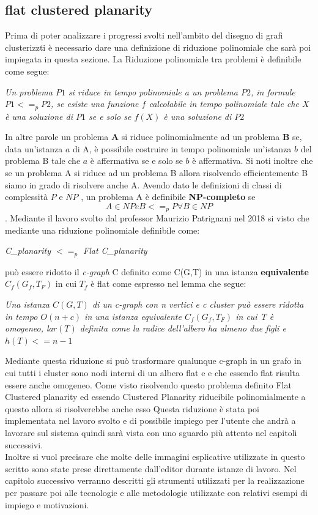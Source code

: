 {\subsection{flat clustered planarity}
Prima di poter analizzare i progressi svolti nell'ambito del disegno di grafi clusterizzti è necessario dare una definizione di riduzione polinomiale che sarà poi impiegata in questa sezione.
La Riduzione polinomiale tra problemi è definibile come segue:
\begin{center}
	\textit{Un problema $P1$ si riduce in tempo polinomiale a un problema $P2$, in formule $P1<=_pP2$, se esiste una funzione $f$ calcolabile in tempo polinomiale tale che $X$ è una soluzione di $P1$ se e solo se $f(X)$ è una soluzione di $P2$}
\end{center}
In altre parole un problema \textbf{A} si riduce polinomialmente ad un problema \textbf{B} se, data un’istanza $a$ di A, è possibile costruire in tempo polinomiale un’istanza $b$ del problema B tale che $a$ è affermativa se e solo se $b$ è affermativa.
Si noti inoltre che se un problema A si riduce ad un problema B allora risolvendo efficientemente B siamo in grado di risolvere anche A. 
Avendo dato le definizioni di classi di complessità $P$ e $NP$ , un problema A è definibile \textbf{NP-completo} se $$A \in NP e B<=_pP \forall B\in NP$$. 
Mediante il lavoro svolto dal professor Maurizio Patrignani nel 2018 si visto che mediante una riduzione polinomiale definibile come:
\begin{center}
\textit{C\_planarity $<=_p$ Flat C\_planarity}
\end{center} 
può essere ridotto il \textit{c-graph} C definito come C(G,T) in una istanza \textbf{equivalente} $C_f(G_f,T_F)$ in cui $T_f$ è flat come espresso nel lemma che segue:
\begin{center}
\textit{Una istanza $C(G,T)$ di un c-graph con n vertici e c cluster può essere ridotta in tempo $O(n+c)$ in una istanza equivalente $C_f(G_f,T_F)$ in cui T è omogeneo, la$r(T)$ definita come la radice dell'albero ha almeno due figli e $h(T)<=n-1$}
\end{center}
Mediante questa riduzione si può trasformare qualunque c-graph in un grafo in cui tutti i cluster sono nodi interni di un albero flat e e che essendo flat risulta essere anche omogeneo. Come visto risolvendo questo problema definito Flat Clustered planarity ed essendo Clustered Planarity riducibile polinomialmente a questo allora si risolverebbe anche esso  Questa riduzione è stata poi implementata nel lavoro svolto e di possibile impiego per l'utente che andrà a lavorare sul sistema quindi sarà vista con uno sguardo più attento nel capitoli successivi. \\
Inoltre si vuol precisare che molte delle immagini esplicative utilizzate in questo scritto sono state prese direttamente dall'editor durante istanze di lavoro.
Nel capitolo successivo verranno descritti gli strumenti utilizzati per la realizzazione per passare poi alle tecnologie e alle metodologie utilizzate con relativi esempi di impiego e motivazioni.
}

